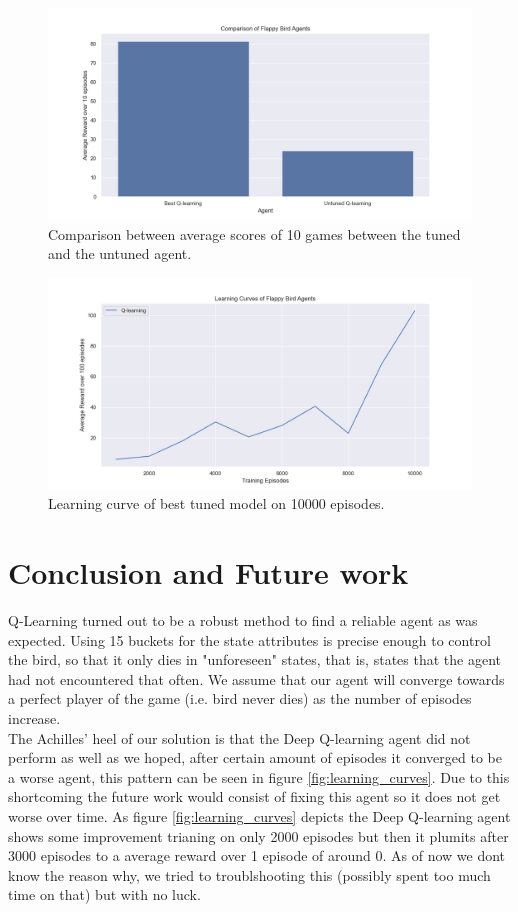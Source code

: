 \documentclass[a4paper,12pt]{article}
\begin{document}
\begin{figure}[H]
    \centering
    \includegraphics[width=\textwidth]{comparison.png}
    \caption{Comparison between average scores of 10 games between the tuned and the untuned agent.}
    \label{fig:comparison.png}
\end{figure}

\begin{figure}[H]
    \centering
    \includegraphics[width=\textwidth]{tuned_q_learning_10000.png}
    \caption{Learning curve of best tuned model on 10000 episodes.}
    \label{fig:learning_curve_best}
\end{figure}

\section{Conclusion and Future work}
Q-Learning turned out to be a robust method to find a reliable agent as was expected. Using 15 buckets for the state attributes is precise enough to
control the bird, so that it only dies in "unforeseen" states, that is, states that the agent had not encountered that often. We assume that our agent
will converge towards a perfect player of the game (i.e. bird never dies) as the number of episodes increase.
\\
The Achilles' heel of our solution is that the Deep Q-learning agent did not perform as well as we hoped, 
after certain amount of episodes it converged to be a worse agent, this pattern can be seen in figure \ref{fig:learning_curves}.
Due to this shortcoming the future work would consist of fixing this agent so it does not get worse over time. 
As figure \ref{fig:learning_curves} depicts the Deep Q-learning agent shows some improvement trianing on only 2000 episodes but then it plumits after 3000 episodes to a average reward over 1 episode of around 0. 
As of now we dont know the reason why, we tried to troublshooting this (possibly spent too much time on that) but with no luck. 
\end{document}
